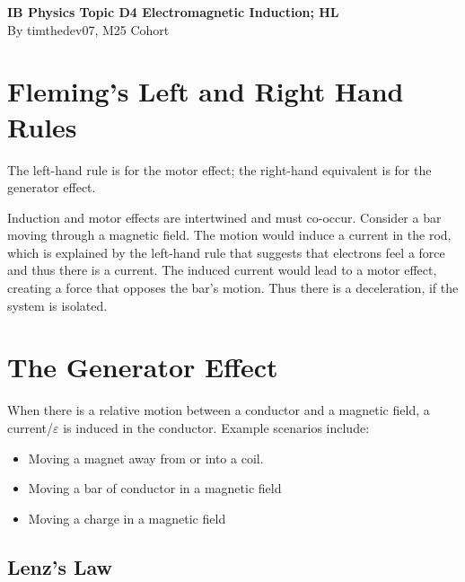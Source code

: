 \documentclass[a4paper,12pt]{article}
\let\oldsection\section
\renewcommand\section{\clearpage\oldsection}
\begin{document}
\pagestyle{fancy}


\begin{titlepage}
  \begin{center}

    \vspace*{8cm}
    \textbf{\Large {IB Physics Topic D4 Electromagnetic Induction; HL}} \\
    \vspace*{1cm}
    \large{By timthedev07, M25 Cohort}


  \end{center}
\end{titlepage}

\pagebreak
\tableofcontents
\pagebreak

\clearpage
\setcounter{page}{1}

\section{Fleming's Left and Right Hand Rules}

The left-hand rule is for the motor effect; the right-hand equivalent is for the generator effect.

Induction and motor effects are intertwined and must co-occur. Consider a bar moving through a magnetic field. The motion would induce a current in the rod, which is explained by the left-hand rule that suggests that electrons feel a force and thus there is a current. The induced current would lead to a motor effect, creating a force that opposes the bar's motion. Thus there is a deceleration, if the system is isolated.

\section{The Generator Effect}

When there is a relative motion between a conductor and a magnetic field, a current/$\varepsilon$ is induced in the conductor. Example scenarios include:
\begin{itemize}
  \item Moving a magnet away from or into a coil.
  \item Moving a bar of conductor in a magnetic field
  \item Moving a charge in a magnetic field
\end{itemize}

\subsection{Lenz's Law}
\end{document}
